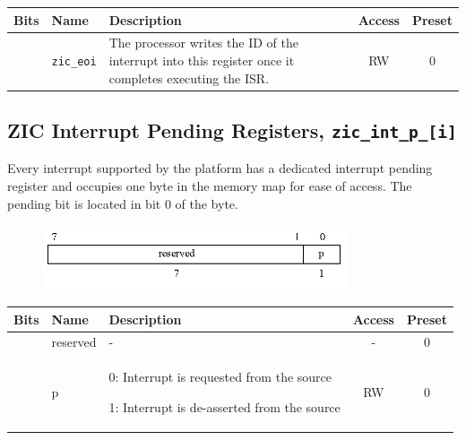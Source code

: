 \vspace{0.5cm}
\begin{table}[H]
    \label{tab:zic_eoi}
        \centering
        \begin{tabular}{l l p{8cm} c c}
         \hline 
         \textbf{Bits} & \textbf{Name} & \textbf{Description} & \textbf{Access} & \textbf{Preset}\\ \hline \hline
         [7:0] & \texttt{zic\_eoi} & The processor writes the ID of the interrupt into this register once it completes executing the ISR. & RW & 0\\ \hline
        \end{tabular}
\end{table}
\vspace{0.5cm}

\subsection{ZIC Interrupt Pending Registers, \texttt{zic\_int\_p\_[i]}}
\label{subsec:zic-int-p}
Every interrupt supported by the platform has a dedicated interrupt pending register and occupies one byte in the memory map for ease of access. The pending bit is located in bit 0 of the byte.

\vspace{0.5cm}
\begin{figure}[H]
    \centering
    \includegraphics[width = 9cm]{images/zic_int_p.png}
    \label{fig:zic_int_p}
\end{figure}
\vspace{0.25cm}

\vspace{0.5cm}
\begin{table}[H]
    \label{tab:zic_int_p}
        \centering
        \begin{tabular}{l l p{8cm} c c}
         \hline 
         \textbf{Bits} & \textbf{Name} & \textbf{Description} & \textbf{Access} & \textbf{Preset} \\ \hline \hline
         [7:1] & reserved & - & - & 0 \\ \hline
         [0] & p & 0: Interrupt is requested from the source
         
         1: Interrupt is de-asserted from the source
 & RW & 0\\ \hline
        \end{tabular}
\end{table}
\vspace{0.5cm}

